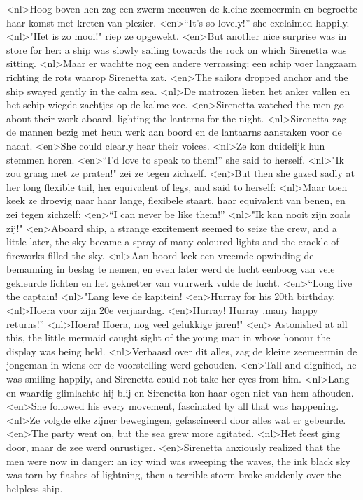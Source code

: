 <nl>Hoog boven hen zag een zwerm meeuwen de kleine zeemeermin en begroette haar komst met kreten van plezier.
<en>“It’s so lovely!” she exclaimed happily.
<nl>"Het is zo mooi!" riep ze opgewekt.
<en>But another nice surprise was in store for her: a ship was slowly sailing towards the rock on which Sirenetta was sitting.
<nl>Maar er wachtte nog een andere verrassing:   een schip voer langzaam richting de rots waarop Sirenetta zat.
<en>The sailors dropped anchor and the ship swayed gently in the calm sea.
<nl>De matrozen lieten het anker vallen en het schip wiegde zachtjes op de kalme zee.
<en>Sirenetta watched the men go about their work aboard, lighting the lanterns for the night.
<nl>Sirenetta zag  de mannen bezig met heun werk aan boord en de lantaarns aanstaken voor de nacht.
<en>She could clearly hear their voices.
<nl>Ze kon duidelijk hun stemmen horen.
<en>“I’d love to speak to them!” she said to herself.
<nl>"Ik zou graag met ze praten!" zei ze tegen zichzelf.
<en>But then she gazed sadly at her long flexible tail, her equivalent of legs, and said to herself: 
<nl>Maar toen keek ze droevig naar haar lange, flexibele staart, haar equivalent van benen, en zei tegen zichzelf: 
<en>“I can never be like them!” 
<nl>"Ik kan nooit zijn zoals zij!" 
<en>Aboard ship, a strange excitement seemed to seize the crew, and a little later, the sky became a spray of many coloured lights and the crackle of fireworks filled the sky.
<nl>Aan boord leek een vreemde opwinding de bemanning in beslag te nemen, en even later werd de lucht eenboog van vele gekleurde lichten en het geknetter van vuurwerk vulde de lucht.
<en>“Long live the captain!
<nl>"Lang leve de kapitein!
<en>Hurray for his 20th birthday.
<nl>Hoera voor zijn 20e verjaardag.
<en>Hurray! Hurray .many happy returns!”
<nl>Hoera! Hoera, nog veel gelukkige  jaren!"
<en> Astonished at all this, the little mermaid caught sight of the young man in whose honour the display was being held.
<nl>Verbaasd over dit alles, zag de kleine zeemeermin de jongeman in wiens eer de voorstelling werd gehouden.
<en>Tall and dignified, he was smiling happily, and Sirenetta could not take her eyes from him.
<nl>Lang en waardig glimlachte hij blij en Sirenetta kon haar ogen niet van hem afhouden.
<en>She followed his every movement, fascinated by all that was happening.
<nl>Ze volgde elke zijner bewegingen, gefascineerd door alles wat er gebeurde.
<en>The party went on, but the sea grew more agitated.
<nl>Het feest ging door, maar de zee werd onrustiger.
<en>Sirenetta anxiously realized that the men were now in danger: an icy wind was sweeping the waves, the ink black sky was torn by flashes of lightning, then a terrible storm broke suddenly over the helpless ship.
